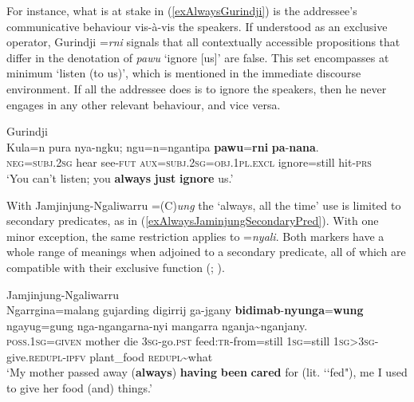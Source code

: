 For instance, what is at stake in (\ref{exAlwaysGurindji}) is the addressee's communicative behaviour vis-à-vis the speakers. If understood as an exclusive operator, Gurindji \mbox{=\textit{rni}} signals that all contextually accessible propositions that differ in the denotation of \textit{pawu} \lq ignore [us]\rq{} are false. This set encompasses at minimum \lq listen (to us)', which is mentioned in the immediate discourse environment. If all the addressee does is to ignore the speakers, then he never engages in any other relevant behaviour, and vice versa.

\begin{exe}
	\ex Gurindji\label{exAlwaysGurindji}\\
	\gll Kula=n pura nya-ngku; ngu=n=ngantipa \textbf{pawu}=\textbf{rni} \textbf{pa}-\textbf{nana}.\\
	\textsc{neg}=\textsc{subj}.2\textsc{sg} hear see-\textsc{fut} \textsc{aux}=\textsc{subj}.\textsc{2sg}=\textsc{obj}.1\textsc{pl}.\textsc{excl} ignore=still hit-\textsc{prs}\\
	\glt \lq You can’t listen; you \textbf{always} \textbf{just} \textbf{ignore} us.' \parencite[20]{McConvell1983}
\end{exe}

With Jamjinjung-Ngaliwarru \mbox{=(C)\textit{ung}} the \lq always, all the time\rq{ }use is limited to secondary predicates, as in (\ref{exAlwaysJaminjungSecondaryPred}). With one minor exception, the same restriction applies to  \mbox{=\textit{nyali}}. Both markers have a whole range of meanings when adjoined to a secondary predicate, all of which are compatible with their exclusive function (\cite[463–465]{McGregor1990}; \cite{SchultzeBerndt2002}).

\begin{exe}
	\ex Jamjinjung-Ngaliwarru\label{exAlwaysJaminjungSecondaryPred}\\
	\gll Ngarrgina=malang gujarding digirrij ga-jgany \textbf{bidimab}-\textbf{nyunga}=\textbf{wung} ngayug=gung nga-ngangarna-nyi mangarra nganja\sim nganjany.\\
	\textsc{poss}.1\textsc{sg}=\textsc{given} mother die 3\textsc{sg}-go.\textsc{pst} feed:\textsc{tr}-from=still 1\textsc{sg}=still 1\textsc{sg}>3\textsc{sg}-give.\textsc{redupl}-\textsc{ipfv} plant\_food \textsc{redupl}\sim what\\
	\glt \lq My mother passed away (\textbf{always}) \textbf{having} \textbf{been} \textbf{cared} for (lit. \lq\lq fed"), me I used to give her food (and) things.' \parencite[235]{SchultzeBerndt2002}
\end{exe}

